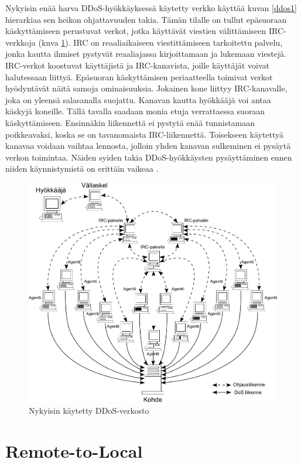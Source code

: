Nykyisin enää harva DDoS-hyökkäyksessä käytetty verkko käyttää kuvan
\ref{ddos1} hierarkiaa sen heikon ohjattavuuden takia. Tämän tilalle
on tullut epäsuoraan käskyttämiseen perustuvat verkot, jotka käyttävät
viestien välittämiseen IRC-verkkoja (kuva \ref{ddos2}). IRC on
reaaliaikaiseen viestittämiseen tarkoitettu palvelu, jonka kautta
ihmiset pystyvät reaaliajassa kirjoittamaan ja lukemaan
viestejä. IRC-verkot koostuvat käyttäjistä ja IRC-kanavista, joille
käyttäjät voivat halutessaan liittyä. Epäsuoran käskyttämisen
periaatteella toimivat verkot hyödyntävät näitä samoja
ominaisuuksia. Jokainen kone liittyy IRC-kanavalle, joka on yleensä
salasanalla suojattu. Kanavan kautta hyökkääjä voi antaa käskyjä
koneille. Tällä tavalla saadaan monia etuja verrattaessa suoraan
käskyttämiseen.  Ensinnäkin liikennettä ei pystytä enää tunnistamaan
poikkeavaksi, koska se on tavanomaista IRC-liikennettä. Toisekseen
käytettyä kanavaa voidaan vaihtaa lennosta, jolloin yhden kanavan
sulkeminen ei pysäytä verkon toimintaa. Näiden syiden takia
DDoS-hyökkäysten pysäyttäminen ennen niiden käynnistymistä on erittäin
vaikeaa \cite{DDOS}.

\begin{figure}[t]
\centering
\includegraphics[width=12cm]{pics/ddos_uusi.pdf}
\caption{Nykyisin käytetty DDoS-verkosto}
\label{ddos2}
\end{figure}

\section{Remote-to-Local}

